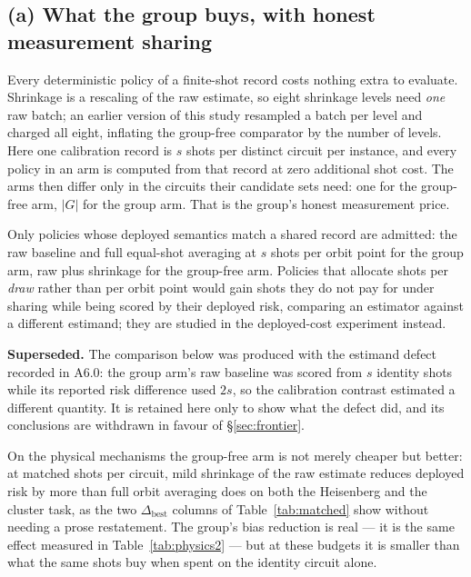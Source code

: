\documentclass{article}
\begin{document}
\subsection{(a) What the group buys, with honest measurement sharing}
\label{sec:matched}
Every deterministic policy of a finite-shot record costs nothing extra to evaluate. Shrinkage is a
rescaling of the raw estimate, so eight shrinkage levels need \emph{one} raw batch; an earlier version of
this study resampled a batch per level and charged all eight, inflating the group-free comparator by the
number of levels. Here one calibration record is $s$ shots per distinct circuit per instance, and every
policy in an arm is computed from that record at zero additional shot cost. The arms then differ only in
the circuits their candidate sets need: one for the group-free arm, $|G|$ for the group arm. That is the
group's honest measurement price.

Only policies whose deployed semantics match a shared record are admitted: the raw baseline and full
equal-shot averaging at $s$ shots per orbit point for the group arm, raw plus shrinkage for the
group-free arm. Policies that allocate shots per \emph{draw} rather than per orbit point would gain shots
they do not pay for under sharing while being scored by their deployed risk, comparing an estimator
against a different estimand; they are studied in the deployed-cost experiment instead.

\textbf{Superseded.} The comparison below was produced with the estimand defect recorded in
A6.0: the group arm's raw baseline was scored from $s$ identity shots while its reported risk
difference used $2s$, so the calibration contrast estimated a different quantity. It is retained here
only to show what the defect did, and its conclusions are withdrawn in favour of
\S\ref{sec:frontier}.






On the physical mechanisms the group-free arm is not merely cheaper but better: at matched shots per
circuit, mild shrinkage of the raw estimate reduces deployed risk by more than full orbit averaging does
on both the Heisenberg and the cluster task, as the two $\Delta_{\mathrm{best}}$ columns of
Table~\ref{tab:matched} show without needing a prose restatement. The group's bias reduction is real
--- it is the same effect measured in Table~\ref{tab:physics2} --- but at these budgets it is smaller
than what the same shots buy when spent on the identity circuit alone.
\end{document}
